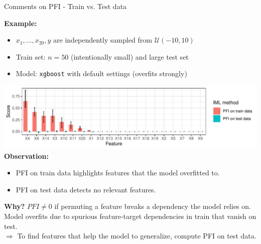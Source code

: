 \documentclass[10pt,compress,t,notes=noshow, xcolor=table]{beamer}
\begin{document}
\begin{frame}{Comments on PFI - Train vs. Test data}

\textbf{Example:} %

\begin{itemize}
  \item $x_1, \dots, x_{20}, y$ are independently sampled from $\mathcal{U} (-10, 10)$
  \item Train set: $n = 50$ (intentionally small) and large test set
  \item Model: \texttt{xgboost} with default settings (overfits strongly)
\end{itemize}

  \includegraphics[width=0.9\linewidth]{figure_man/pfi_test_vs_train.pdf}\\
\textbf{Observation:} 
\begin{itemize}
    \item PFI on train data highlights features that the model overfitted to.
    \item PFI on test data detects no relevant features.
\end{itemize} 
\pause
\medskip

\textbf{Why?} $PFI \neq 0$ if permuting a feature breaks a dependency the model relies on. 
Model overfits due to spurious feature-target dependencies in train that vanish on test.\\
$\Rightarrow$ To find features that help the model to generalize, compute PFI on test data.
  
\end{frame}
\end{document}
